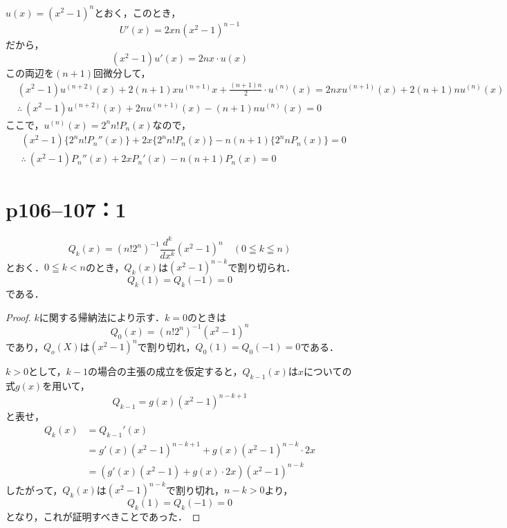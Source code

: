 \begin{tproof}
    $u(x)= (x^2-1)^n$とおく，このとき，
    \[
        U'(x)= 2x n(x^2-1)^{n-1}
    \]
    だから，
    \[
        (x^2-1) u'(x)=2nx \cdot u(x)
    \]
    この両辺を$(n+1)$回微分して，
    \begin{align*}
         & (x^2-1)u^{(n+2)}(x)+2(n+1)x u^{(n+1)} x + \frac{(n+1)n}{2} \cdot u^{(n)} (x) = 2nx u^{(n+1)}(x) + 2(n+1) n u^{(n)}(x) \\
         & \therefore ~(x^2-1)u^{(n+2)}(x) + 2n u^{(n+1)}(x)-(n+1)n u^{(n)}(x)=0
    \end{align*}
    ここで，$ u^{(n)} (x)= 2^n n! P_n (x)$なので，
    \begin{align*}
         & (x^2 -1) \{ 2^n n! P_n ''(x) \} +2x \{ 2^n n! P_n (x) \} -n(n+1) \{ 2^n n P_n(x) \} =0 \\
         & \therefore ~ (x^2-1) P_n ''(x)+2x P_n '(x) -n(n+1) P_n (x)=0
    \end{align*}
\end{tproof}

\newpage
\section*{p106--107：1}

\begin{lemma}{}{}
    \[
        Q_k (x)= (n! 2^n)^{-1} \frac{d^k}{dx^k} (x^2-1)^n \quad (0 \leqq k \leqq n)
    \]
    とおく．$0 \leqq k <n$のとき，$Q_k (x)$は$(x^2-1)^{n-k}$で割り切られ．
    \[
        Q_k (1)= Q_k(-1)=0
    \]
    である．
\end{lemma}

\begin{proof}
    $k$に関する帰納法により示す．$k=0$のときは
    \[
        Q_0(x)= (n! 2^n)^{-1} (x^2-1)^n
    \]
    であり，$Q_o(X)$は$(x^2-1)^n$で割り切れ，$Q_0(1)=Q_0(-1)=0$である．

    $k>0$として，$k-1$の場合の主張の成立を仮定すると，$Q_{k-1}(x)$は$x$についての式$g(x)$を用いて，
    \[
        Q_{k-1} = g(x)(x^2-1)^{n-k+1}
    \]
    と表せ，
    \begin{align*}
        Q_k (x) & =Q_{k-1}' (x)                                        \\
                & = g'(x)(x^2-1)^{n-k+1} + g(x) (x^2-1)^{n-k} \cdot 2x \\
                & =(g'(x)(x^2-1)+g(x) \cdot 2x) (x^2-1)^{n-k}
    \end{align*}
    したがって，$Q_k(x)$は$(x^2-1)^{n-k}$で割り切れ，$n-k >0$より，
    \[
        Q_k (1)= Q_k(-1)=0
    \]
    となり，これが証明すべきことであった．
\end{proof}

